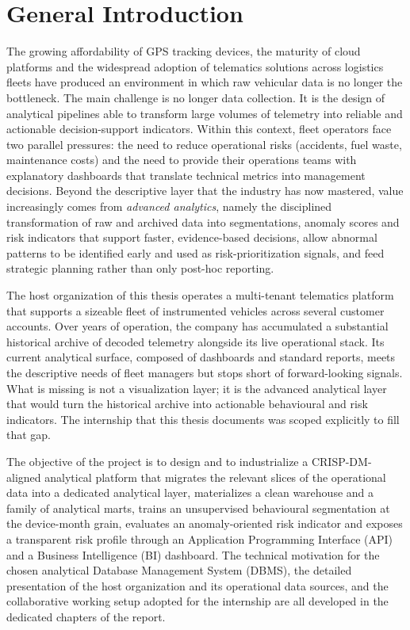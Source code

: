 \chapter*{General Introduction}

The growing affordability of GPS tracking devices, the maturity of cloud platforms and the widespread adoption of telematics solutions across logistics fleets have produced an environment in which raw vehicular data is no longer the bottleneck. The main challenge is no longer data collection. It is the design of analytical pipelines able to transform large volumes of telemetry into reliable and actionable decision-support indicators. Within this context, fleet operators face two parallel pressures: the need to reduce operational risks (accidents, fuel waste, maintenance costs) and the need to provide their operations teams with explanatory dashboards that translate technical metrics into management decisions. Beyond the descriptive layer that the industry has now mastered, value increasingly comes from \emph{advanced analytics}, namely the disciplined transformation of raw and archived data into segmentations, anomaly scores and risk indicators that support faster, evidence-based decisions, allow abnormal patterns to be identified early and used as risk-prioritization signals, and feed strategic planning rather than only post-hoc reporting.

The host organization of this thesis operates a multi-tenant telematics platform that supports a sizeable fleet of instrumented vehicles across several customer accounts. Over years of operation, the company has accumulated a substantial historical archive of decoded telemetry alongside its live operational stack. Its current analytical surface, composed of dashboards and standard reports, meets the descriptive needs of fleet managers but stops short of forward-looking signals. What is missing is not a visualization layer; it is the advanced analytical layer that would turn the historical archive into actionable behavioural and risk indicators. The internship that this thesis documents was scoped explicitly to fill that gap.

The objective of the project is to design and to industrialize a CRISP-DM-aligned analytical platform that migrates the relevant slices of the operational data into a dedicated analytical layer, materializes a clean warehouse and a family of analytical marts, trains an unsupervised behavioural segmentation at the device-month grain, evaluates an anomaly-oriented risk indicator and exposes a transparent risk profile through an Application Programming Interface (API) and a Business Intelligence (BI) dashboard. The technical motivation for the chosen analytical Database Management System (DBMS), the detailed presentation of the host organization and its operational data sources, and the collaborative working setup adopted for the internship are all developed in the dedicated chapters of the report.


